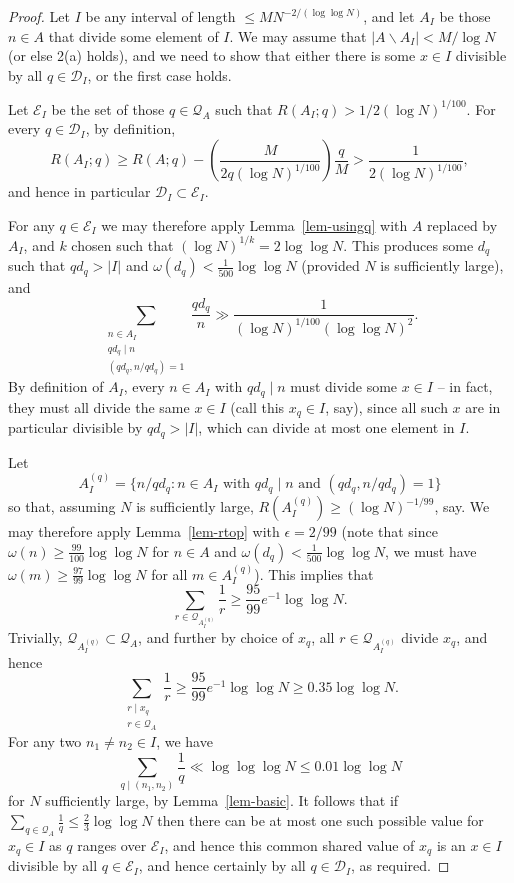 \documentclass[12pt]{amsart}
\newcommand{\abs}[1]{\left\lvert #1\right\rvert}
\newcommand{\brac}[1]{\left( #1\right)}
\begin{document}
\begin{proof}
Let $I$ be any interval of length $\leq MN^{-2/(\log\log N)}$, and let $A_I$ be those $n\in A$ that divide some element of $I$. We may assume that $\abs{A\backslash A_I}< M/\log N$ (or else 2(a) holds), and we need to show that either there is some $x\in I$ divisible by all $q\in\mathcal{D}_I$, or the first case holds. 

Let $\mathcal{E}_I$ be the set of those $q\in\mathcal{Q}_A$ such that $R(A_I;q)> 1/2(\log N)^{1/100}$. For every $q\in \mathcal{D}_I$, by definition, 
\[R(A_I; q) \geq R(A;q) - \brac{\frac{M}{2q(\log N)^{1/100}}}\frac{q}{M}>\frac{1}{2(\log N)^{1/100}},\]
and hence in particular $\mathcal{D}_I\subset \mathcal{E}_I$.

For any $q\in \mathcal{E}_I$ we may therefore apply Lemma~\ref{lem-usingq} with $A$ replaced by $A_I$, and $k$ chosen such that $(\log N)^{1/k}=2\log\log N$. This produces some $d_q$ such that $qd_q>\abs{I}$ and $\omega(d_q)<\tfrac{1}{500}\log\log N$ (provided $N$ is sufficiently large), and
\[\sum_{\substack{n\in A_I\\ qd_q\mid n\\ (qd_q,n/qd_q)=1}}\frac{qd_q}{n}\gg \frac{1}{(\log N)^{1/100}(\log\log N)^2}.\]
By definition of $A_I$, every $n\in A_I$ with $qd_q\mid n$ must divide some $x\in I$ -- in fact, they must all divide the same $x\in I$ (call this $x_q\in I$, say), since all such $x$ are in particular divisible by $qd_q>\abs{I}$, which can divide at most one element in $I$. 

Let 
\[A_I^{(q)}=\{ n/qd_q : n\in A_I\textrm{ with }qd_q\mid n\textrm{ and }(qd_q,n/qd_q)=1\}\]
so that, assuming $N$ is sufficiently large, $R(A_I^{(q)})\geq (\log N)^{-1/99}$, say. We may therefore apply Lemma~\ref{lem-rtop} with $\epsilon=2/99$ (note that since $\omega(n)\geq \frac{99}{100}\log\log N$ for $n\in A$ and $\omega(d_q)<\frac{1}{500}\log\log N$, we must have $\omega(m)\geq \frac{97}{99}\log\log N$ for all $m\in A_I^{(q)}$). This implies that 
\[\sum_{r\in \mathcal{Q}_{A_I^{(q)}}}\frac{1}{r}\geq \frac{95}{99}e^{-1}\log\log N.\]
Trivially, $\mathcal{Q}_{A_I^{(q)}}\subset \mathcal{Q}_A$, and further by choice of $x_q$, all $r\in \mathcal{Q}_{A_I^{(q)}}$ divide $x_q$, and hence 
\[\sum_{\substack{r\mid x_q\\ r\in \mathcal{Q}_A}}\frac{1}{r}\geq \frac{95}{99}e^{-1}\log\log N\geq 0.35\log\log N.\]
For any two $n_1\neq n_2\in I$, we have
\[\sum_{q\mid (n_1,n_2)}\frac{1}{q}\ll \log\log\log N\leq 0.01\log\log N\]
for $N$ sufficiently large, by Lemma~\ref{lem-basic}. It follows that if $\sum_{q\in\mathcal{Q}_A}\frac{1}{q}\leq \frac{2}{3}\log\log N$ then there can be at most one such possible value for $x_q\in I$ as $q$ ranges over $\mathcal{E}_I$, and hence this common shared value of $x_q$ is an $x\in I$ divisible by all $q\in\mathcal{E}_I$, and hence certainly by all $q\in\mathcal{D}_I$, as required.
 

\end{proof}
\end{document}
